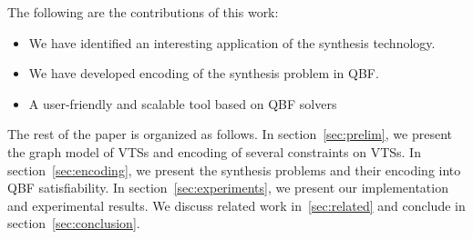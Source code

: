 The following are the contributions of this work:
\begin{itemize}
\item We have identified an interesting application of
  the synthesis technology.
\item We have developed encoding of the synthesis problem in QBF.
\item A user-friendly and scalable tool based on QBF solvers
\end{itemize}

The rest of the paper is organized as follows.
%
In section~\ref{sec:prelim}, we present the graph model of VTSs and encoding of several
constraints on VTSs.
%
In section~\ref{sec:encoding}, we present the synthesis problems and their
encoding into QBF satisfiability.
%
In section~\ref{sec:experiments}, we present our implementation and experimental results.
%
We discuss related work in~\ref{sec:related} and conclude in section~\ref{sec:conclusion}.



